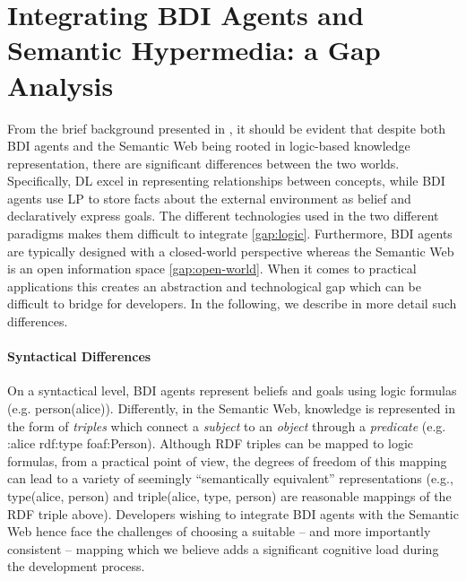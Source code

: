 \documentclass[
]{ceurart}
\begin{document}
\section{Integrating \acs{BDI} Agents and Semantic Hypermedia: a Gap Analysis}
\label{sec:gap-analysis}

From the brief background presented in , 
it should be evident that
despite both \ac{BDI} agents and the Semantic Web being rooted in logic-based knowledge representation,
there are significant differences between the two worlds.
Specifically, \ac{DL} excel in representing relationships between concepts, while \ac{BDI} agents use \ac{LP} to store facts about the external environment as belief and declaratively express goals.
The different technologies used in the two different paradigms makes them difficult to integrate \ref{gap:logic}.
%
Furthermore, \ac{BDI} agents are typically designed with a closed-world perspective whereas the Semantic Web is an open information space \ref{gap:open-world}.
%
When it comes to practical applications this creates an abstraction and technological gap
which can be difficult to bridge for developers.
%
In the following, we describe in more detail such differences.

\paragraph{Syntactical Differences}

On a syntactical level, \ac{BDI} agents represent beliefs and goals using logic formulas
(e.g. \textsf{person(alice)}).
%
Differently, in the Semantic Web, knowledge is represented in the form of \emph{triples} which connect a \emph{subject} to an \emph{object} through a \emph{predicate} (e.g. \textsf{:alice rdf:type foaf:Person}).
%
Although \ac{RDF} triples can be mapped to logic formulas, from a practical point of view, the degrees of freedom of this mapping can lead to a variety of seemingly ``semantically equivalent'' representations (e.g., \textsf{type(alice, person)} and \textsf{triple(alice, type, person)} are reasonable mappings of the \ac{RDF} triple above).
%
Developers wishing to integrate \ac{BDI} agents with the Semantic Web hence face the challenges of choosing a suitable -- and more importantly consistent -- mapping which we believe adds a significant cognitive load during the development process.
\end{document}
